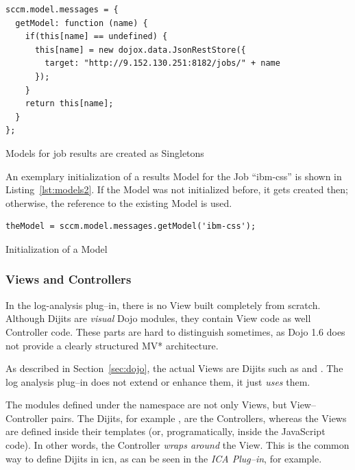 \begin{listing}[H]
\begin{verbatim}
sccm.model.messages = {
  getModel: function (name) {
    if(this[name] == undefined) {
      this[name] = new dojox.data.JsonRestStore({
        target: "http://9.152.130.251:8182/jobs/" + name
      });
    }
    return this[name];
  }
};
\end{verbatim}
\caption{Models for job results are created as Singletons}
\label{lst:models}
\end{listing}

An exemplary initialization of a results Model for the Job ``ibm-css'' is shown in Listing~\ref{lst:models2}. If the Model was not initialized before, it gets created then; otherwise, the reference to the existing Model is used.

\begin{listing}[H]
\begin{verbatim}
theModel = sccm.model.messages.getModel('ibm-css');
\end{verbatim}
\caption{Initialization of a Model}
\label{lst:models2}
\end{listing}

\subsubsection*{Views and Controllers}
In the log-analysis plug--in, there is no View built completely from scratch. Although Dijits are \emph{visual} Dojo modules, they contain View code as well Controller code. These parts are hard to distinguish sometimes, as Dojo 1.6 does not provide a clearly structured MV* architecture.

As described in Section~\ref{sec:dojo}, the actual Views are Dijits such as  and . The log analysis plug--in does not extend or enhance them, it just \emph{uses} them.

The modules defined under the namespace  are not only Views, but View--Controller pairs. The Dijits, for example , are the Controllers, whereas the Views are defined inside their templates (or, programatically, inside the JavaScript code). In other words, the Controller \emph{wraps around} the View. This is the common way to define Dijits in \acl{icn}, as can be seen in the \emph{ICA Plug--in}, for example.

